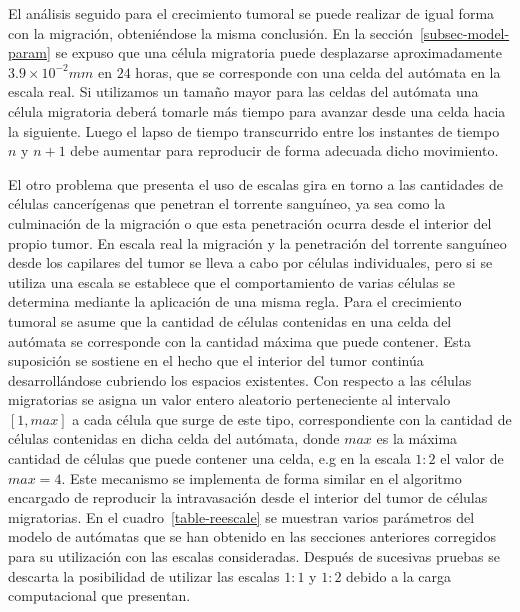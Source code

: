 El an\'alisis seguido para el crecimiento tumoral se puede realizar de igual forma con la migraci\'on, obteni\'endose la misma conclusi\'on. En la secci\'on~\ref{subsec-model-param} se expuso que una c\'elula migratoria puede desplazarse aproximadamente $3$.$9 \times 10^{-2}mm$ en $24$ horas, que se corresponde con una celda del aut\'omata en la escala real. Si utilizamos un tama\~no mayor para las celdas del aut\'omata una c\'elula migratoria deber\'a tomarle m\'as tiempo para avanzar desde una celda hacia la siguiente. Luego el lapso de tiempo transcurrido entre los instantes de tiempo $n$ y $n+1$ debe aumentar para reproducir de forma adecuada dicho movimiento. 

El otro problema que presenta el uso de escalas gira en torno a las cantidades de c\'elulas cancer\'igenas que penetran el torrente sangu\'ineo, ya sea como la culminaci\'on de la migraci\'on o que esta penetraci\'on ocurra desde el interior del propio tumor. En escala real la migraci\'on y la penetraci\'on del torrente sangu\'ineo desde los capilares del tumor se lleva a cabo por c\'elulas individuales, pero si se utiliza una escala se establece que el comportamiento de varias c\'elulas se determina mediante la aplicaci\'on de una misma regla. Para el crecimiento tumoral se asume que la cantidad de c\'elulas contenidas en una celda del aut\'omata se corresponde con la cantidad m\'axima que puede contener. Esta suposici\'on se sostiene en el hecho que el interior del tumor contin\'ua desarroll\'andose cubriendo los espacios existentes. Con respecto a las c\'elulas migratorias se asigna un valor entero aleatorio perteneciente al intervalo $[1,max]$ a cada c\'elula que surge de este tipo, correspondiente con la cantidad de c\'elulas contenidas en dicha celda del aut\'omata, donde $max$ es la m\'axima cantidad de c\'elulas que puede contener una celda, e.g en la escala $1:2$ el valor de $max=4$. Este mecanismo se implementa de forma similar en el algoritmo encargado de reproducir la intravasaci\'on desde el interior del tumor de c\'elulas migratorias. En el cuadro~\ref{table-reescale} se muestran varios par\'ametros del modelo de aut\'omatas que se han obtenido en las secciones anteriores corregidos para su utilizaci\'on con las escalas consideradas. Despu\'es de sucesivas pruebas se descarta la posibilidad de utilizar las escalas $1:1$ y $1:2$ debido a la carga computacional que presentan. 
